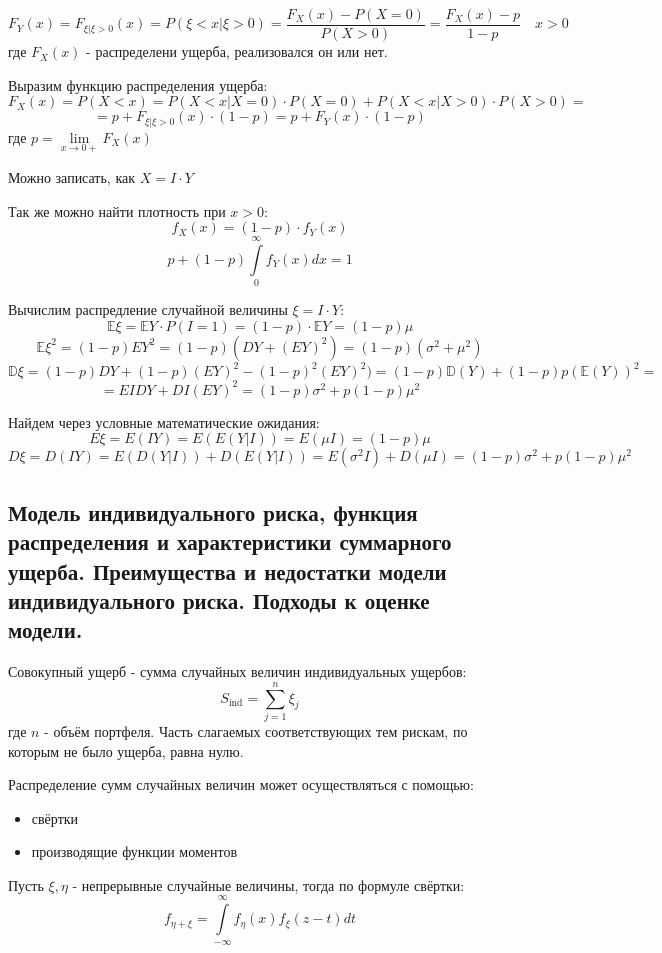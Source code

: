 \documentclass[%
12pt, %
final, %
oneside, %
onecolumn, %
centertags]{article} %
\theoremstyle{plain}
\theoremstyle{definition}
\theoremstyle{remark}
\begin{document}
$$F_{Y}(x) = F_{\xi \vert \xi >0}(x) = P(\xi < x \vert \xi > 0) = \frac{F_{X}(x) - P(X = 0)}{P(X >0)} = \frac{F_{X}(x) - p}{1 - p} \quad x>0$$
где $F_{X}(x)$ - распределени ущерба, реализовался он или нет.

Выразим функцию распределения ущерба:
$$F_{X}(x) = P(X<x) = P(X < x \vert X = 0) \cdot P(X = 0) + P(X <x \vert X >0) \cdot P(X>0) = $$
$$ = p + F_{\xi \vert \xi >0}(x) \cdot (1-p) = p + F_{Y}(x) \cdot (1-p)$$
где $p = \lim\limits_{x \to 0+} F_{X}(x)$

Можно записать, как $X = I \cdot Y$

Так же можно найти плотность при $x>0$:
$$f_{X}(x) = (1-p) \cdot f_{Y}(x)$$
$$p + (1-p)\int\limits_0^{\infty}f_{Y}(x)dx = 1$$

Вычислим распредление случайной величины $\xi = I \cdot Y$:
$$\mathbb{E}\xi = \mathbb{E}Y \cdot P(I = 1) = (1-p)\cdot \mathbb{E}Y = (1-p) \mu$$
$$\mathbb{E}\xi^2 = (1-p)EY^2 = (1-p)(DY + (EY)^2) = (1-p)(\sigma^2 + \mu^2)$$
$$\mathbb{D}\xi = (1-p)DY + (1-p)(EY)^2 - (1-p)^2(EY)^2) = (1-p)\mathbb{D}(Y) + (1-p)p(\mathbb{E}(Y))^2 =$$
$$= EIDY + DI(EY)^2 = (1-p)\sigma^2 + p(1-p)\mu^2$$

Найдем через условные математические ожидания:
$$E\xi = E(IY)=E(E(Y \vert I)) = E(\mu I) = (1-p)\mu$$
$$D\xi = D(IY) = E(D(Y \vert I)) + D(E(Y \vert I)) = E(\sigma^2I) +D(\mu I) = (1-p)\sigma^2 + p(1-p)\mu^2$$
\subsection{Модель индивидуального риска, функция распределения и характеристики суммарного ущерба. Преимущества и недостатки модели индивидуального риска. Подходы к оценке модели.}

Совокупный ущерб - сумма случайных величин индивидуальных ущербов:
$$S_{\operatorname{ind}} = \sum\limits_{j=1}^n \xi_j$$
где $n$ - объём портфеля. Часть слагаемых соответствующих тем рискам, по которым не было ущерба, равна нулю.

Распределение сумм случайных величин может осуществляться с помощью:
\begin{itemize}
	\item свёртки
	\item производящие функции моментов
\end{itemize}

Пусть $\xi, \eta$ - непрерывные случайные величины, тогда по формуле свёртки:
$$f_{\eta + \xi} = \int\limits_{-\infty}^{\infty} f_{\eta}(x)f_{\xi}(z-t)dt$$
\end{document}
